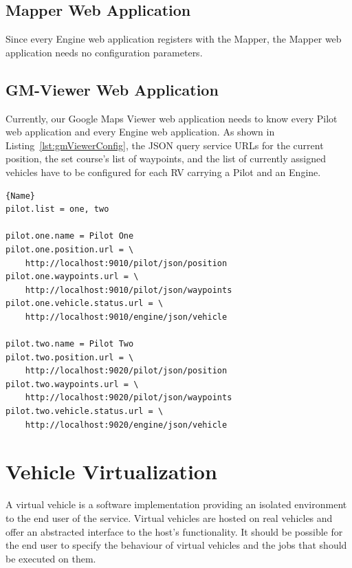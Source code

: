 \subsection{Mapper Web Application}
Since every Engine web application registers with the Mapper, the Mapper web application needs no
configuration parameters.



\subsection{GM-Viewer Web Application}
Currently, our Google Maps Viewer web application needs to know every Pilot web application
and every Engine web application. As shown in Listing~\ref{lst:gmViewerConfig}, the \acs{JSON} \cite{RFC_4627}
query service \acsp{URL} for the current position, the set course's list of waypoints, and the  
list of currently assigned vehicles have to be configured for each \ac{RV} carrying a Pilot and an Engine.   

\lstset{tabsize=3,language=Tex}
\begin{lstlisting}[caption={Google Maps Viewer Configuration Example},mathescape=true,label=lst:gmViewerConfig]{Name}
pilot.list = one, two

pilot.one.name = Pilot One
pilot.one.position.url = \
	http://localhost:9010/pilot/json/position
pilot.one.waypoints.url = \
	http://localhost:9010/pilot/json/waypoints
pilot.one.vehicle.status.url = \
	http://localhost:9010/engine/json/vehicle

pilot.two.name = Pilot Two
pilot.two.position.url = \
	http://localhost:9020/pilot/json/position
pilot.two.waypoints.url = \
	http://localhost:9020/pilot/json/waypoints
pilot.two.vehicle.status.url = \
	http://localhost:9020/engine/json/vehicle
\end{lstlisting}





\section{Vehicle Virtualization}

A virtual vehicle is a software implementation providing an isolated environment to the end user of the service. Virtual vehicles are hosted on real vehicles and offer an abstracted interface to the host's functionality. It should be possible for the end user to specify the behaviour of virtual vehicles and the jobs that should be executed on them.

